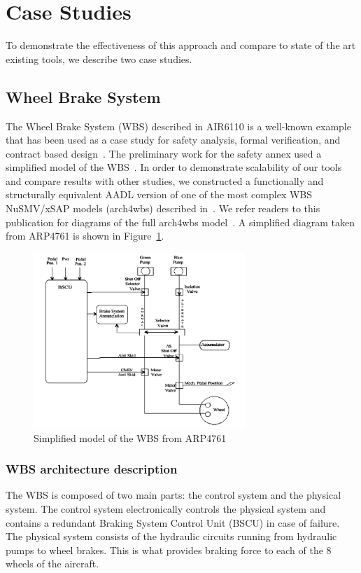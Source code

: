 \section{Case Studies}

To demonstrate the effectiveness of this approach and compare to state of the art existing tools, we describe two case studies.

\subsection{Wheel Brake System}
The Wheel Brake System (WBS) described in AIR6110 is a well-known example that has been used as a case study for safety analysis, formal verification, and contract based design~\cite{DBLP:conf/cav/BozzanoCPJKPRT15, 10.1007/978-3-319-11936-6-7, CAV2015:BoCiGrMa, Joshi05:SafeComp,AIR6110}. The preliminary work for the safety annex used a simplified model of the WBS~\cite{Stewart17:IMBSA}. In order to demonstrate scalability of our tools and compare results with other studies, we constructed a functionally and structurally equivalent AADL version of one of the most complex WBS NuSMV/xSAP models (arch4wbs) described in~\cite{DBLP:conf/cav/BozzanoCPJKPRT15,mattareiThesis}. We refer readers to this publication for diagrams of the full arch4wbs model~\cite{DBLP:conf/cav/BozzanoCPJKPRT15}. A simplified diagram taken from ARP4761 is shown in Figure~\ref{fig:wbs_arp4761}. 

\begin{figure}[h]
\begin{center}
\includegraphics[width=8cm]{images/wbs_arp4761}
\caption{Simplified model of the WBS from ARP4761} \label{fig:wbs_arp4761}
\end{center}
\end{figure}

\subsubsection{WBS architecture description}
The WBS is composed of two main parts: the control system and the physical system. The control system electronically controls the physical system and contains a redundant Braking System Control Unit (BSCU) in case of failure. The physical system consists of the hydraulic circuits running from hydraulic pumps to wheel brakes. This is what provides braking force to each of the 8 wheels of the aircraft.

